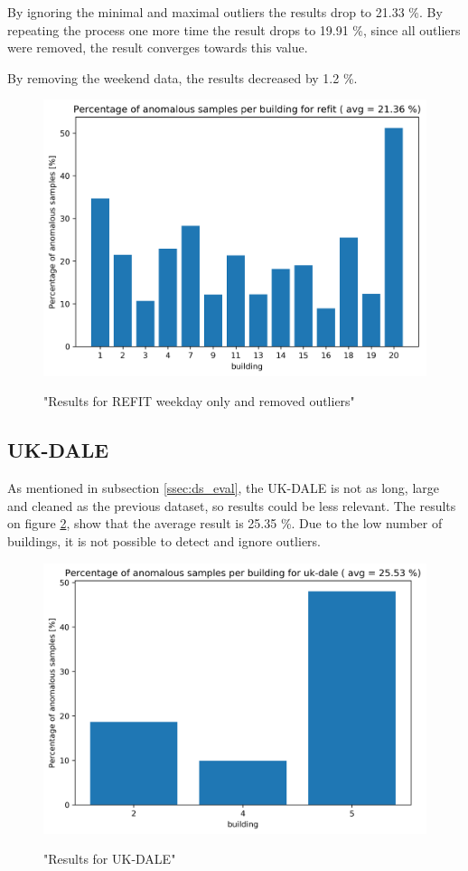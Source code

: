 By ignoring the minimal and maximal outliers the results drop to 21.33 \%.
By repeating the process one more time the result drops to 19.91 \%, since all outliers were removed, the result converges towards this value. 

By removing the weekend data, the results decreased by 1.2 \%. 

\begin{figure}[H]
	\centering
	\caption{"Results for REFIT weekday only and removed outliers"}
	\includegraphics[width=.8\textwidth]{Figures/EC/refit_res_nw_2.png}
	\label{fig:refit_res_nw_2"}
\end{figure}

\subsection{UK-DALE}

As mentioned in subsection \ref{ssec:ds_eval}, the UK-DALE is not as long, large and cleaned as the previous dataset, so results could be less relevant.
The results on figure \ref{fig:ukdale_res}, show that the average result is 25.35 \%. Due to the low number of buildings, it is not possible to detect and ignore outliers.

\begin{figure}[H]
	\centering
	\caption{"Results for UK-DALE"}
	\includegraphics[width=.7\textwidth]{Figures/EC/ukdale_res.png}
	\label{fig:ukdale_res}
\end{figure}

